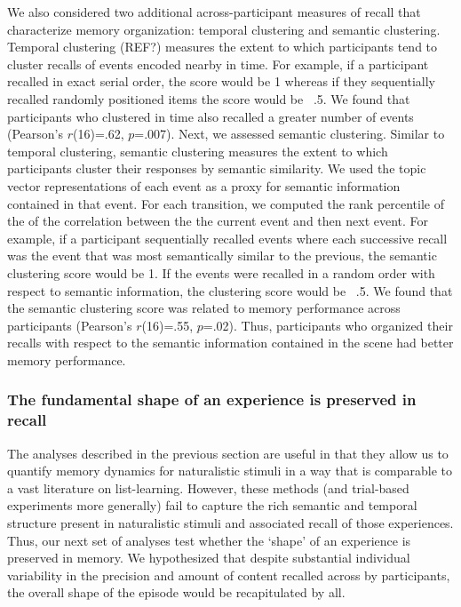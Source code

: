 \documentclass{article}
\begin{document}
{ We also considered two additional across-participant measures of recall that characterize memory organization: temporal clustering and semantic clustering. Temporal clustering (REF?) measures the extent to which participants tend to cluster recalls of events encoded nearby in time.  For example, if a participant recalled in exact serial order, the score would be 1 whereas if they sequentially recalled randomly positioned items the score would be ~.5.  We found that participants who clustered in time also recalled a greater number of events (Pearson's $r$(16)=.62, $p$=.007). Next, we assessed semantic clustering.  Similar to temporal clustering, semantic clustering measures the extent to which participants cluster their responses by semantic similarity.  We used the topic vector representations of each event as a proxy for semantic information contained in that event.  For each transition, we computed the rank percentile of the of the correlation between the the current event and then next event. For example, if a participant sequentially recalled events where each successive recall was the event that was most semantically similar to the previous, the semantic clustering score would be 1.  If the events were recalled in a random order with respect to semantic information, the clustering score would be ~.5. We found that the semantic clustering score was related to memory performance across participants (Pearson's $r$(16)=.55, $p$=.02).  Thus, participants who organized their recalls with respect to the semantic information contained in the scene had better memory performance.

\subsubsection{The fundamental shape of an experience is preserved in recall}
The analyses described in the previous section are useful in that they allow us to quantify memory dynamics for naturalistic stimuli in a way that is comparable to a vast literature on list-learning. However, these methods (and trial-based experiments more generally) fail to capture the rich semantic and temporal structure present in naturalistic stimuli and associated recall of those experiences. Thus, our next set of analyses test whether the `shape' of an experience is preserved in memory. We hypothesized that despite substantial individual variability in the precision and amount of content recalled across by participants, the overall shape of the episode would be recapitulated by all.

}
\end{document}
